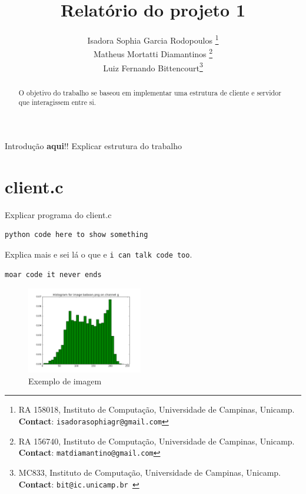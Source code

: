 \documentclass[10pt,twocolumn,letterpaper]{article}
\begin{document}
\title{Relatório do projeto 1}
\author{Isadora Sophia Garcia Rodopoulos \thanks{RA 158018, Instituto de Computação, Universidade de Campinas, Unicamp. \textbf{Contact}: \tt\small{isadorasophiagr@gmail.com}} \\
Matheus Mortatti Diamantinos \thanks{RA 156740, Instituto de Computação, Universidade de Campinas, Unicamp. \textbf{Contact}: \tt\small{matdiamantino@gmail.com}}\\
Luiz Fernando Bittencourt\thanks{MC833, Instituto de Computação, Universidade de Campinas, Unicamp. \textbf{Contact}: \tt\small{bit@ic.unicamp.br }}\\
}

\maketitle
\begin{abstract}
O objetivo do trabalho se baseou em implementar uma estrutura de cliente e servidor que interagissem entre si.
\end{abstract}

Introdução \textbf{aqui}!! Explicar estrutura do trabalho

\section{client.c}
Explicar programa do client.c

\begin{lstlisting}[caption={Conexão do cliente com o endereço do servidor}, label=Algorithm]
python code here to show something
\end{lstlisting}

Explica mais e sei lá o que e \texttt{i can talk code too}.

\begin{lstlisting}[caption={descreva aqui}, label=Algorithm]
moar code it never ends
\end{lstlisting}

\begin{figure}[!h]
\begin{center}
    \includegraphics[width=0.45\textwidth]{img/sample.png}
    \caption{Exemplo de imagem}   
\end{center} 
\end{figure}
\end{document}
